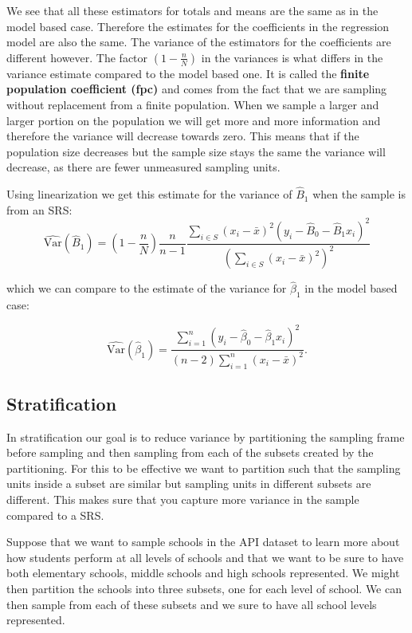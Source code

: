 \documentclass{article}
\begin{document}
We see that all these estimators for totals and means are the same as in the
model based case. Therefore the estimates for the coefficients in the regression
model are also the same. The variance of the estimators for the coefficients are
different however.
The factor \(\left( 1 - \frac{n}{N} \right)\) in the variances is what differs in
the variance estimate compared to the model based one. It is called the
\textbf{finite population coefficient (fpc)} and comes from the fact that we are
sampling without replacement from a finite population.
When we sample a larger and larger portion on the population we will get more
and more information and therefore the variance will decrease towards zero.
This means that if the population size decreases but the sample size stays the
same the variance will decrease, as there are fewer unmeasured sampling units.

Using linearization we get this estimate for the variance of \(\hat{B}_1\) when
the sample is from an SRS:
\begin{equation*}
\widehat{\mathrm{Var}}(\hat{B}_1) = \left( 1 - \frac{n}{N} \right) \frac{n}{n - 1} \frac{\sum_{i \in S} \left( x_i - \bar{x} \right)^2 \left( y_i - \hat{B}_0 - \hat{B}_1 x_i \right)^2}
{\left( \sum_{i \in S} \left( x_i - \bar{x} \right)^2 \right)^2}
\end{equation*}

which we can compare to the estimate of the variance for \(\hat{\beta}_1\) in
the model based case:

\begin{equation*}
  \widehat{\mathrm{Var}} \left( \hat{\beta}_1 \right) = \frac{\sum_{i = 1}^n\left( y_i - \hat{\beta}_0 -
  \hat{\beta}_1 x_i \right)^2}{
    \left( n - 2 \right)\sum_{i = 1}^n \left( x_i - \bar{x} \right)^2}.
\end{equation*}


\subsection{Stratification}

In stratification our goal is to reduce variance by partitioning the sampling
frame before sampling and then sampling from each of the subsets created by the
partitioning. For this to be effective we want to partition such that the
sampling units inside a subset are similar but sampling units in different
subsets are different. This makes sure that you capture more variance in the
sample compared to a SRS.

Suppose that we want to sample schools in the API dataset to learn more about
how students perform at all levels of schools and that we want to be sure to
have both elementary schools, middle schools and high schools represented. We
might then partition the schools into three subsets, one for each level of
school. We can then sample from each of these subsets and we sure to have all
school levels represented.
\end{document}
